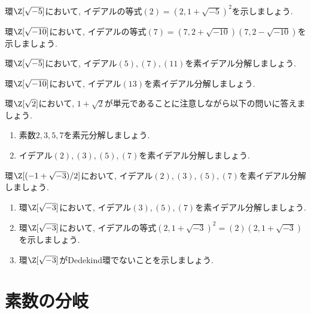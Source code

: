 \documentclass[11pt,b5paper,oneside,titlepage,lualatex]{ltjsreport}
\numberwithin{equation}{section} %
\begin{document}
\begin{exc}{}{}
	環$ \Z[\sqrt{-5}] $において, イデアルの等式$ (2) = (2, 1 + \sqrt{-5})^2 $を示しましょう. 
\end{exc}

\begin{exc}{}{}
	環$ \Z[\sqrt{-10}] $において, イデアルの等式$ (7) = (7, 2 + \sqrt{-10}) (7, 2 - \sqrt{-10}) $を示しましょう. 
\end{exc}

\begin{exc}{}{}
	環$ \Z[\sqrt{-5}] $において, イデアル$ (5), (7), (11) $を素イデアル分解しましょう. 
\end{exc}

\begin{exc}{}{}
	環$ \Z[\sqrt{-10}] $において, イデアル$ (13) $を素イデアル分解しましょう. 
\end{exc}

\begin{exc}{}{}
	環$ \Z[\sqrt{2}] $において, $ 1 + \sqrt{2} $が単元であることに注意しながら以下の問いに答えましょう.
	\begin{enumerate}
		\item 素数$ 2, 3, 5, 7 $を素元分解しましょう. 
		\item イデアル$ (2), (3), (5), (7) $を素イデアル分解しましょう. 
	\end{enumerate}
\end{exc}

\begin{exc}{}{}
	環$ \Z[(-1 + \sqrt{-3})/2] $において, イデアル$ (2), (3), (5), (7) $を素イデアル分解しましょう. 
\end{exc}

\begin{exc}{}{}
	\begin{enumerate}
		\item 環$ \Z[\sqrt{-3}] $において, イデアル$ (3), (5), (7) $を素イデアル分解しましょう. 
		\item 環$ \Z[\sqrt{-3}] $において, イデアルの等式$ (2, 1+\sqrt{-3})^2 = (2)(2, 1+\sqrt{-3}) $を示しましょう. 
		\item 環$ \Z[\sqrt{-3}] $がDedekind環でないことを示しましょう.
	\end{enumerate}
\end{exc}


\section{素数の分岐} \label{sec:素数の分岐}
\end{document}
